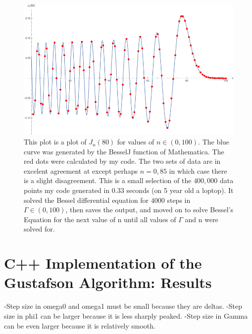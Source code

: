 \documentclass[onecolumn, groupedaddress, 10pt]{revtex4-1}
\begin{document}
\begin{figure}[t]
	\centering
	\includegraphics[width=.75\linewidth]{BesselJn80.png}
	\caption{This plot is a plot of $J_n(80)$ for values of $n\in (0,100)$.  The blue curve was generated by the BesselJ function of Mathematica.  The red dots were calculated by my code.  The two sets of data are in excelent agreement at except perhaps $n=0,85$ in which case there is a slight disagreement.  This is a small selection of the $400,000$ data points my code generated in $0.33$ seconds (on 5 year old a loptop).  It solved the Bessel differential equation for $4000$ steps in $\Gamma \in (0,100)$, then saves the output, and moved on to solve Bessel's Equation for the next value of n until all values of $\Gamma$ and n were solved for.}
\end{figure}


\section{C++ Implementation of the Gustafson Algorithm: Results}
-Step size in omega0 and omega1 must be small because they are deltas.
-Step size in phi1 can be larger because it is less sharply peaked.
-Step size in Gamma can be even larger because it is relatively smooth.
\end{document}
